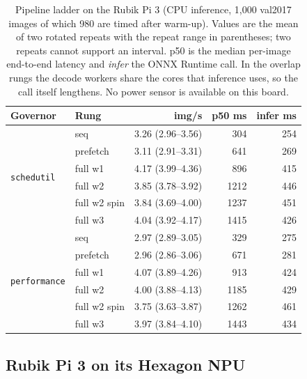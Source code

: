\begin{table}[t]
\centering
\caption{Pipeline ladder on the Rubik Pi 3 (CPU inference, 1,000
val2017 images of which 980 are timed after warm-up). Values are the
mean of two rotated repeats with the repeat range in parentheses; two
repeats cannot support an interval. p50 is the median per-image
end-to-end latency and \emph{infer} the ONNX Runtime call. In the
overlap rungs the decode workers share the cores that inference uses,
so the call itself lengthens. No power sensor is available on this
board.}
\label{tab:rubikladder}
\footnotesize
\setlength{\tabcolsep}{3pt}
\begin{tabular}{@{}llrrr@{}}
\toprule
Governor & Rung & img/s & p50 ms & infer ms \\
\midrule
\multirow{6}{*}{\texttt{schedutil}}
 & seq           & 3.26 (2.96--3.56) &  304 & 254 \\
 & prefetch      & 3.11 (2.91--3.31) &  641 & 269 \\
 & full w1       & 4.17 (3.99--4.36) &  896 & 415 \\
 & full w2       & 3.85 (3.78--3.92) & 1212 & 446 \\
 & full w2 spin  & 3.84 (3.69--4.00) & 1237 & 451 \\
 & full w3       & 4.04 (3.92--4.17) & 1415 & 426 \\
\midrule
\multirow{6}{*}{\texttt{performance}}
 & seq           & 2.97 (2.89--3.05) &  329 & 275 \\
 & prefetch      & 2.96 (2.86--3.06) &  671 & 281 \\
 & full w1       & 4.07 (3.89--4.26) &  913 & 424 \\
 & full w2       & 4.00 (3.88--4.13) & 1185 & 429 \\
 & full w2 spin  & 3.75 (3.63--3.87) & 1262 & 461 \\
 & full w3       & 3.97 (3.84--4.10) & 1443 & 434 \\
\bottomrule
\end{tabular}
\end{table}

\subsection{Rubik Pi 3 on its Hexagon NPU}
\label{sec:rubikhtp}

